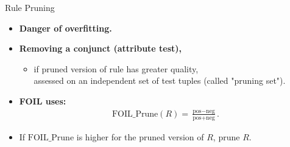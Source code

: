 \begin{frame}{Rule Pruning}
	\begin{itemize}
		\item \textbf{Danger of {\color{airforceblue}overfitting}.}
		\item \textbf{Removing a conjunct (attribute test),}
		      \begin{itemize}
			      \item if pruned version of rule has greater quality,\\
			            assessed on an independent set of test tuples (called "pruning set").
		      \end{itemize}
		\item \textbf{FOIL uses:}
		      \begin{align*}
			      \text{FOIL\_Prune}(R) = \frac{\text{pos}-\text{neg}}{\text{pos}+\text{neg}}.
		      \end{align*}
		\item If $\text{FOIL\_Prune}$ is higher for the pruned version of $R$, prune $R$.
	\end{itemize}
\end{frame}
